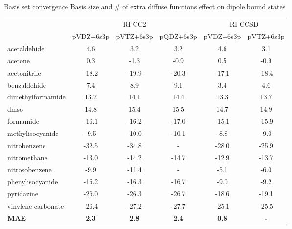 \documentclass[9pt,t,xcolor=table]{beamer}
\begin{document}
\begin{frame}{\huge Basis set convergence}\large
	Basis size and \# of extra diffuse functions effect on dipole bound states\\
	\begin{table}[h!]
		\centering
		\footnotesize
		\begin{tabular}{lccccc}
		 & \multicolumn{3}{c}{RI-CC2} & \multicolumn{2}{c}{RI-CCSD} \\
		\cmidrule(lr){2-4} \cmidrule(lr){5-6}
		 & pVDZ+6s3p & pVTZ+6s3p & pQDZ+6s3p & pVDZ+6s3p & pVTZ+6s3p \\
		\midrule
		acetaldehide & 4.6 & 3.2 & 3.2 & 4.6 & 3.1 \\
		acetone & 0.3 & -1.3 & -0.9 & 0.5 & -0.9 \\
		acetonitrile & -18.2 & -19.9 & -20.3 & -17.1 & -18.4 \\
		benzaldehide & 7.4 & 8.9 & 9.1 & 3.4 & 4.6 \\
		dimethylformamide & 13.2 & 14.1 & 14.4 & 13.3 & 13.7 \\
		dmso & 14.8 & 15.4 & 15.5 & 14.7 & 14.9 \\
		formamide & -16.1 & -16.2 & -17.0 & -15.1 & -15.9 \\
		methylisocyanide & -9.5 & -10.0 & -10.1 & -8.8 & -9.0 \\
		nitrobenzene & -32.5 & -34.8 & - & -28.0 & -25.9 \\
		nitromethane & -13.0 & -14.2 & -14.7 & -12.9 & -13.7 \\
		nitrosobenzene & -9.9 & -11.4 & - & -5.1 & -6.0 \\
		phenylisocyanide & -15.2 & -16.3 & -16.7 & -9.0 & -9.2 \\
		pyridazine & -26.0 & -26.3 & -26.7 & -18.6 & -19.1 \\
		vinylene carbonate& -26.4 & -27.2 & -27.7 & -25.1 & -25.5 \\
		\midrule
		\textbf{MAE} & \textbf{2.3} & \textbf{2.8} & \textbf{2.4} & \textbf{0.8} & \textbf{-} \\
		\bottomrule
		\end{tabular}
	\end{table}
\end{frame}
\end{document}
